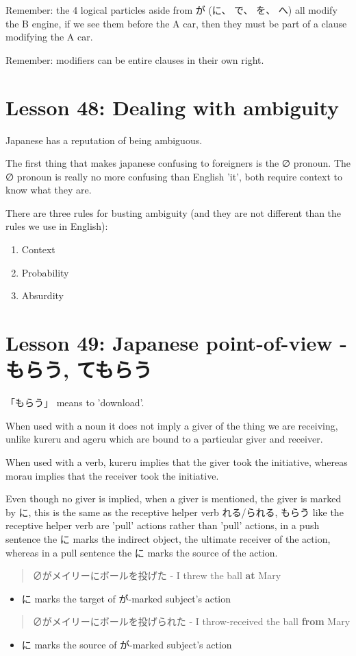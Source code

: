 \documentclass[11pt]{article}
\begin{document}
Remember: the 4 logical particles aside from が (に、 で、 を、 へ) all modify the B engine, if we see them before the A car, then they must be part of a clause modifying the A car.

Remember: modifiers can be entire clauses in their own right.

\section{Lesson 48: Dealing with ambiguity}
\label{sec:org1a610c5}
Japanese has a reputation of being ambiguous.

The first thing that makes japanese confusing to foreigners is the ∅ pronoun. The ∅ pronoun is really no more confusing than English 'it', both require context to know what they are.

There are three rules for busting ambiguity (and they are not different than the rules we use in English):
\begin{enumerate}
\item Context
\item Probability
\item Absurdity
\end{enumerate}
\section{Lesson 49: Japanese point-of-view - もらう, てもらう}
\label{sec:orge7ca430}
「もらう」 means to 'download'.

When used with a noun it does not imply a giver of the thing we are receiving, unlike kureru and ageru which are bound to a particular giver and receiver.

When used with a verb, kureru implies that the giver took the initiative, whereas morau implies that the receiver took the initiative.

Even though no giver is implied, when a giver is mentioned, the giver is marked by に, this is the same as the receptive helper verb れる/られる, もらう like the receptive helper verb are 'pull' actions rather than 'pull' actions, in a push sentence the に marks the indirect object, the ultimate receiver of the action, whereas in a pull sentence the に marks the source of the action.
\begin{quote}
∅がメイリーにボールを投げた - I threw the ball \textbf{at} Mary
\end{quote}
\begin{itemize}
\item に marks the target of が-marked subject's action
\end{itemize}
\begin{quote}
∅がメイリーにボールを投げられた - I throw-received the ball \textbf{from} Mary
\end{quote}
\begin{itemize}
\item に marks the source of が-marked subject's action
\end{itemize}
\end{document}
